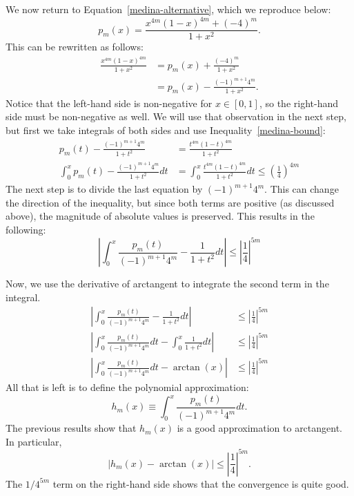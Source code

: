 \documentclass[copyright,creativecommons]{eptcs}
\begin{document}
We now return to Equation~\ref{medina-alternative}, which we reproduce
below:
\begin{equation}
p_m(x) = \frac{x^{4m}(1-x)^{4m} + (-4)^m}{1+x^2}.
\end{equation}
This can be rewritten as follows:
\begin{align}
\frac{x^{4m}(1-x)^{4m}}{1+x^2}  &= p_m(x) + \frac{(-4)^m}{1+x^2} \\ 
                                                &= p_m(x) - \frac{(-1)^{m+1}4^m}{1+x^2}.
\end{align}
Notice that the left-hand side is non-negative for $x\in [0,1]$, so
the right-hand side must be non-negative as well. We will use that
observation in the next step, but first we take integrals of both
sides and use Inequality~\ref{medina-bound}:
\begin{align}
p_m(t) - \frac{(-1)^{m+1}4^m}{1+t^2} &= \frac{t^{4m}(1-t)^{4m}}{1+t^2} \\
\int_{0}^{x} p_m(t) - \frac{(-1)^{m+1}4^m}{1+t^2} dt &= \int_{0}^{x} \frac{t^{4m}(1-t)^{4m}}{1+t^2} dt 
                                                                                \le \left(\frac{1}{4}\right)^{4m}
\end{align}
The next step is to divide the last equation by $(-1)^{m+1}4^m$.  This
can change the direction of the inequality, but since both terms are
positive (as discussed above), the magnitude of absolute values is
preserved.  This results in the following:
\begin{equation}
\left| \int_{0}^{x} \frac{p_m(t)}{(-1)^{m+1}4^m} - \frac{1}{1+t^2} dt \right| \le \left|\frac{1}{4}\right|^{5m}
\end{equation}

Now, we use the derivative of arctangent to integrate the second term
in the integral.
\begin{align}
\left| \int_{0}^{x} \frac{p_m(t)}{(-1)^{m+1}4^m} - \frac{1}{1+t^2} dt \right| &\le \left|\frac{1}{4}\right|^{5m} \\
\left| \int_{0}^{x} \frac{p_m(t)}{(-1)^{m+1}4^m} dt - \int_{0}^{x}\frac{1}{1+t^2} dt \right| &\le \left|\frac{1}{4}\right|^{5m} \\
\left| \int_{0}^{x} \frac{p_m(t)}{(-1)^{m+1}4^m} dt - \arctan(x) \right| &\le \left|\frac{1}{4}\right|^{5m} 
\end{align}
All that is left is to define the polynomial approximation:
\begin{equation}
h_m(x) \equiv \int_{0}^{x} \frac{p_m(t)}{(-1)^{m+1}4^m} dt.
\end{equation}
The previous results show that $h_m(x)$ is a good approximation to
arctangent.  In particular,
\begin{equation}
\left| h_m(x)  - \arctan(x) \right| \le \left|\frac{1}{4}\right|^{5m}.
\end{equation}
The $1/4^{5m}$ term on the right-hand side shows that the convergence
is quite good.
\end{document}
